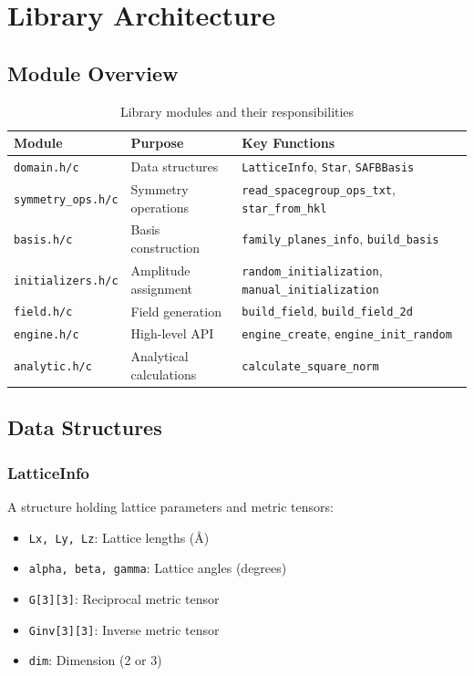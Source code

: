 \chapter{Library Architecture}

\section{Module Overview}

\begin{table}[h]
\centering
\begin{tabular}{lll}
\hline\hline
\textbf{Module} & \textbf{Purpose} & \textbf{Key Functions} \\
\hline
\texttt{domain.h/c} & Data structures & \texttt{LatticeInfo}, \texttt{Star}, \texttt{SAFBBasis} \\
\texttt{symmetry\_ops.h/c} & Symmetry operations & \texttt{read\_spacegroup\_ops\_txt}, \texttt{star\_from\_hkl} \\
\texttt{basis.h/c} & Basis construction & \texttt{family\_planes\_info}, \texttt{build\_basis} \\
\texttt{initializers.h/c} & Amplitude assignment & \texttt{random\_initialization}, \texttt{manual\_initialization} \\
\texttt{field.h/c} & Field generation & \texttt{build\_field}, \texttt{build\_field\_2d} \\
\texttt{engine.h/c} & High-level API & \texttt{engine\_create}, \texttt{engine\_init\_random} \\
\texttt{analytic.h/c} & Analytical calculations & \texttt{calculate\_square\_norm} \\
\hline\hline
\end{tabular}
\caption{Library modules and their responsibilities}
\end{table}

\section{Data Structures}

\subsection{LatticeInfo}

A structure holding lattice parameters and metric tensors:

\begin{itemize}
    \item \texttt{Lx, Ly, Lz}: Lattice lengths (Å)
    \item \texttt{alpha, beta, gamma}: Lattice angles (degrees)
    \item \texttt{G[3][3]}: Reciprocal metric tensor
    \item \texttt{Ginv[3][3]}: Inverse metric tensor
    \item \texttt{dim}: Dimension (2 or 3)
\end{itemize}

